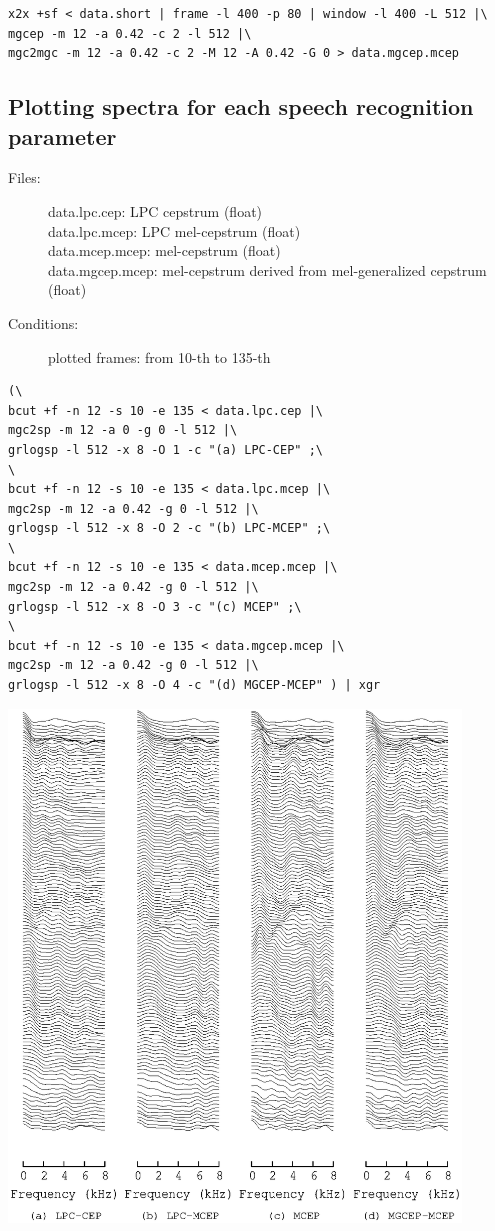 \documentclass[a4paper,10pt]{article}
\begin{document}
\begin{verbatim}
x2x +sf < data.short | frame -l 400 -p 80 | window -l 400 -L 512 |\
mgcep -m 12 -a 0.42 -c 2 -l 512 |\
mgc2mgc -m 12 -a 0.42 -c 2 -M 12 -A 0.42 -G 0 > data.mgcep.mcep
\end{verbatim}

\subsection{Plotting spectra for each speech recognition parameter}

\begin{description}
\item[Files:]
  data.lpc.cep: LPC cepstrum (float)\\
  data.lpc.mcep: LPC mel-cepstrum (float)\\
  data.mcep.mcep: mel-cepstrum  (float)\\
  data.mgcep.mcep: mel-cepstrum derived from mel-generalized cepstrum (float)
\item[Conditions:]
  plotted frames: from 10-th to 135-th\\
\end{description}

\begin{verbatim}
(\
bcut +f -n 12 -s 10 -e 135 < data.lpc.cep |\
mgc2sp -m 12 -a 0 -g 0 -l 512 |\
grlogsp -l 512 -x 8 -O 1 -c "(a) LPC-CEP" ;\
\
bcut +f -n 12 -s 10 -e 135 < data.lpc.mcep |\
mgc2sp -m 12 -a 0.42 -g 0 -l 512 |\
grlogsp -l 512 -x 8 -O 2 -c "(b) LPC-MCEP" ;\
\
bcut +f -n 12 -s 10 -e 135 < data.mcep.mcep |\
mgc2sp -m 12 -a 0.42 -g 0 -l 512 |\
grlogsp -l 512 -x 8 -O 3 -c "(c) MCEP" ;\
\
bcut +f -n 12 -s 10 -e 135 < data.mgcep.mcep |\
mgc2sp -m 12 -a 0.42 -g 0 -l 512 |\
grlogsp -l 512 -x 8 -O 4 -c "(d) MGCEP-MCEP" ) | xgr
\end{verbatim}
 
\includegraphics[width=12cm]{eps/data.all.mcep.grlogsp.eps}
\end{document}
